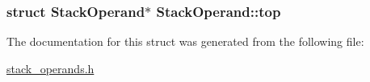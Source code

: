 \subsubsection[{\texorpdfstring{top}{top}}]{\setlength{\rightskip}{0pt plus 5cm}struct {\bf Stack\+Operand}$\ast$ Stack\+Operand\+::top}\hypertarget{structStackOperand_a11a33c73ab08f65a14fb53af2308d052}{}\label{structStackOperand_a11a33c73ab08f65a14fb53af2308d052}


The documentation for this struct was generated from the following file\+:\begin{DoxyCompactItemize}
\item 
\hyperlink{stack__operands_8h}{stack\+\_\+operands.\+h}\end{DoxyCompactItemize}
